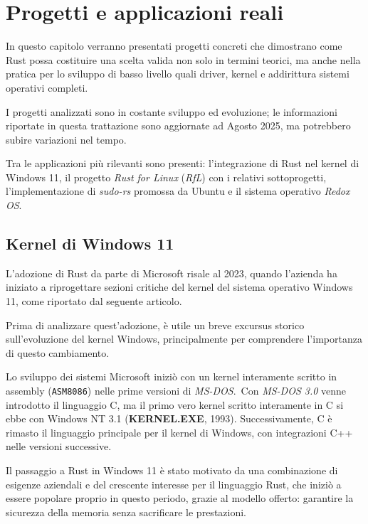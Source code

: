
\chapter{Progetti e applicazioni reali}\label{cap:05}

In questo capitolo verranno presentati progetti concreti che dimostrano
come Rust possa costituire una scelta valida non solo in termini teorici, ma anche nella pratica per lo sviluppo 
di basso livello quali driver, kernel e addirittura sistemi operativi completi.

I progetti analizzati sono in costante sviluppo ed evoluzione;
le informazioni riportate in questa trattazione sono aggiornate ad Agosto 2025, ma potrebbero subire
variazioni nel tempo.

Tra le applicazioni più rilevanti sono presenti: l'integrazione di Rust nel kernel di Windows 11,
il progetto \textit{Rust for Linux} (\textit{RfL}) con i relativi sottoprogetti, l'implementazione 
di \textit{sudo-rs} promossa da Ubuntu e il sistema operativo \textit{Redox OS}.\ 

\section{Kernel di Windows 11}
L'adozione di Rust da parte di Microsoft risale al 2023, quando l'azienda ha iniziato a riprogettare sezioni critiche del
kernel del sistema operativo Windows 11, come riportato dal seguente articolo\cite{microsoft-rust}.

Prima di analizzare quest'adozione, è utile un breve excursus storico sull'evoluzione del kernel Windows, principalmente per comprendere l'importanza di questo cambiamento.
\begin{framed}
\noindent Lo sviluppo dei sistemi Microsoft iniziò con un kernel interamente scritto in assembly (\texttt{ASM8086}) nelle prime 
versioni di \textit{MS-DOS}.\ Con \textit{MS-DOS 3.0} venne introdotto il linguaggio C, ma il primo vero kernel scritto interamente in C
si ebbe con Windows NT 3.1 (\textbf{KERNEL.EXE}, 1993). Successivamente, C è rimasto il linguaggio principale per il kernel di Windows, con integrazioni C++ nelle
versioni successive.
\end{framed}
\noindent Il passaggio a Rust in Windows 11 è stato motivato da una combinazione di esigenze aziendali e del crescente interesse per il linguaggio Rust, che
iniziò a essere popolare proprio in questo periodo, grazie al modello offerto: garantire la sicurezza della memoria senza sacrificare le prestazioni.

